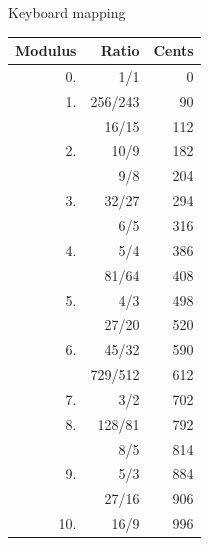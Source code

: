 \documentclass[a4paper,11pt]{article}
\begin{document}
\begin{figure}
\begin{subfigure}{0.5\textwidth}

\caption{Keyboard mapping}
\vspace{6.05cm}
\label{fig:indic-mapping}
\end{subfigure}
\hfill
\begin{subfigure}{0.4\textwidth}
\centering
\begin{tabular}{rrr}
\toprule
Modulus &   Ratio   &   Cents   \\
\midrule
0.      &       1/1     &       0\vspace{0.25cm} \\
1.      &       256/243 &       90      \\
        &       16/15   &       112\vspace{0.25cm}  \\
2.      &       10/9    &       182     \\
        &       9/8     &       204\vspace{0.25cm}  \\
3.      &       32/27   &       294     \\
        &       6/5     &       316\vspace{0.25cm}  \\
4.      &       5/4     &       386     \\
        &       81/64   &       408\vspace{0.25cm}  \\
5.      &       4/3     &       498     \\
        &       27/20   &       520\vspace{0.25cm}  \\
6.      &       45/32   &       590     \\
        &       729/512 &       612\vspace{0.25cm}  \\
7.      &       3/2     &       702\vspace{0.25cm}  \\
8.      &       128/81  &       792     \\
        &       8/5     &       814\vspace{0.25cm}  \\
9.      &       5/3     &       884     \\
        &       27/16   &       906\vspace{0.25cm}  \\
10.     &       16/9    &       996     \\

\end{tabular}
\end{subfigure}
\end{figure}
\end{document}
